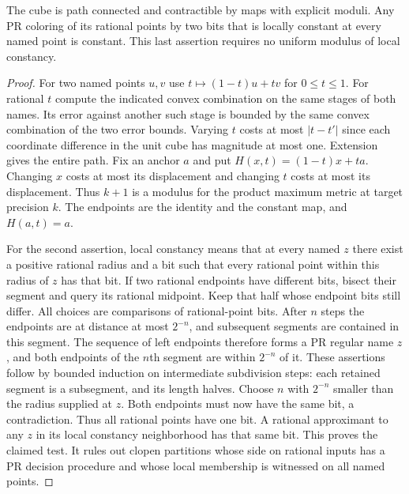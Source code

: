 \begin{theorem}\label{idx-metric277}
The cube is path connected and contractible by maps with explicit moduli.
Any PR coloring of its rational points by two bits that is locally constant
at every named point is constant. This last assertion requires no uniform
modulus of local constancy.
\end{theorem}
\begin{proof}
For two named points $u,v$ use $t\mapsto (1-t)u+tv$ for $0\le t\le1$.
For rational $t$ compute the indicated convex combination on the same
stages of both names. Its error against another such stage is bounded by
the same convex combination of the two error bounds. Varying $t$ costs
at most $|t-t'|$ since each coordinate difference in the unit cube has
magnitude at most one. Extension gives the entire path. Fix an anchor $a$
and put $H(x,t)=(1-t)x+ta$. Changing $x$ costs at most its displacement
and changing $t$ costs at most its displacement. Thus $k+1$ is a modulus
for the product maximum metric at target precision $k$. The endpoints
are the identity and the constant map, and $H(a,t)=a$.

For the second assertion, local constancy means that at every named $z$
there exist a positive rational radius and a bit such that every rational
point within this radius of $z$ has that bit. If two rational endpoints
have different bits, bisect their segment and query its rational midpoint.
Keep that half whose endpoint bits still differ. All choices are comparisons
of rational-point bits. After $n$ steps the endpoints are at distance at
most $2^{-n}$, and subsequent segments are contained in this segment.
The sequence of left endpoints therefore forms a PR regular name $z$, and
both endpoints of the $n$th segment are within $2^{-n}$ of it. These
assertions follow by bounded induction on intermediate subdivision steps:
each retained segment is a subsegment, and its length halves. Choose $n$
with $2^{-n}$ smaller than the radius supplied at $z$. Both endpoints must
now have the same bit, a contradiction. Thus all rational points have one
bit. A rational approximant to any $z$ in its local constancy neighborhood
has that same bit. This proves the claimed test. It rules out clopen
partitions whose side on rational inputs has a PR decision procedure and
whose local membership is witnessed on all named points.
\end{proof}

